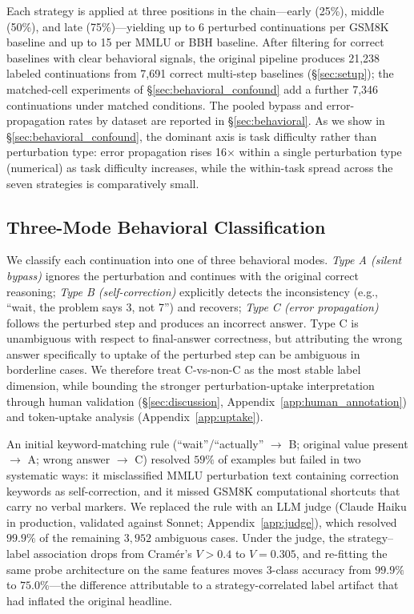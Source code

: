\documentclass[10pt]{article} %
\begin{document}
Each strategy is applied at three positions in the chain---early (25\%), middle (50\%), and late (75\%)---yielding up to 6 perturbed continuations per GSM8K baseline and up to 15 per MMLU or BBH baseline. After filtering for correct baselines with clear behavioral signals, the original pipeline produces 21{,}238 labeled continuations from 7{,}691 correct multi-step baselines (\S\ref{sec:setup}); the matched-cell experiments of \S\ref{sec:behavioral_confound} add a further 7{,}346 continuations under matched conditions. The pooled bypass and error-propagation rates by dataset are reported in \S\ref{sec:behavioral}. As we show in \S\ref{sec:behavioral_confound}, the dominant axis is task difficulty rather than perturbation type: error propagation rises 16$\times$ within a single perturbation type (numerical) as task difficulty increases, while the within-task spread across the seven strategies is comparatively small.

\subsection{Three-Mode Behavioral Classification}
\label{sec:classification}

We classify each continuation into one of three behavioral modes. \emph{Type A (silent bypass)} ignores the perturbation and continues with the original correct reasoning; \emph{Type B (self-correction)} explicitly detects the inconsistency (e.g., ``wait, the problem says 3, not 7'') and recovers; \emph{Type C (error propagation)} follows the perturbed step and produces an incorrect answer. Type C is unambiguous with respect to final-answer correctness, but attributing the wrong answer specifically to uptake of the perturbed step can be ambiguous in borderline cases. We therefore treat C-vs-non-C as the most stable label dimension, while bounding the stronger perturbation-uptake interpretation through human validation (\S\ref{sec:discussion}, Appendix~\ref{app:human_annotation}) and token-uptake analysis (Appendix~\ref{app:uptake}).

An initial keyword-matching rule (``wait''/``actually'' $\to$ B; original value present $\to$ A; wrong answer $\to$ C) resolved $59\%$ of examples but failed in two systematic ways: it misclassified MMLU perturbation text containing correction keywords as self-correction, and it missed GSM8K computational shortcuts that carry no verbal markers. We replaced the rule with an LLM judge (Claude Haiku in production, validated against Sonnet; Appendix~\ref{app:judge}), which resolved $99.9\%$ of the remaining $3{,}952$ ambiguous cases. Under the judge, the strategy--label association drops from Cram\'{e}r's $V > 0.4$ to $V = 0.305$, and re-fitting the same probe architecture on the same features moves 3-class accuracy from $99.9\%$ to $75.0\%$---the difference attributable to a strategy-correlated label artifact that had inflated the original headline.
\end{document}
